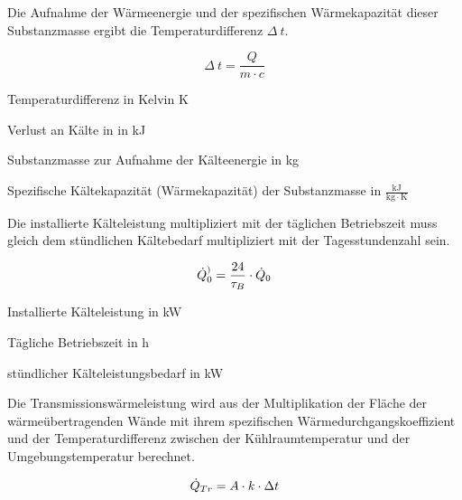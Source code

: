 Die Aufnahme der Wärmeenergie und der spezifischen Wärmekapazität dieser
Substanzmasse ergibt die Temperaturdifferenz $\Delta\:t$.

\begin{equation}
	\Delta\:t = \frac{Q}{m\cdot c}
\label{tdif}
\end{equation}

\begin{description}[\dth]

	\item[$\Delta\:t$] Temperaturdifferenz in Kelvin K
	\item[$Q$] Verlust an K\"alte in in kJ
	\item[$m$] Substanzmasse zur Aufnahme der K\"alteenergie in kg
	\item[$c$] Spezifische K\"altekapazit\"at (W\"armekapazit\"at) der
	Substanzmasse in $\mathrm{\frac{kJ}{kg \cdot K}}$

\end{description}
\vspace{0.5cm}

Die installierte Kälteleistung multipliziert mit der täglichen Betriebszeit muss
gleich dem stündlichen K\"altebedarf multipliziert mit der Tagesstundenzahl
sein.

\begin{equation}
	\pinstall = \frac{24}{ \tau_{B} }  \cdot \pkalt \label{pinstall}
\end{equation}

\begin{description}[\dth]

	\item[$\pinstall$] Installierte Kälteleistung in kW
	\item[$\tau_{B}$] Tägliche Betriebszeit in h
	\item[$\pkalt$] st\"undlicher Kälteleistungsbedarf in
	kW

\end{description}
\vspace{0.5cm}

Die Transmissionswärmeleistung wird aus der Multiplikation der Fläche
der wärmeübertragenden Wände mit ihrem spezifischen Wärmedurchgangskoeffizient
und der Temperaturdifferenz zwischen der Kühlraumtemperatur und der
Umgebungstemperatur berechnet.

\begin{equation}
	\ptrans = A \cdot k \cdot \Delta t
	\label{ptrans}
\end{equation}

